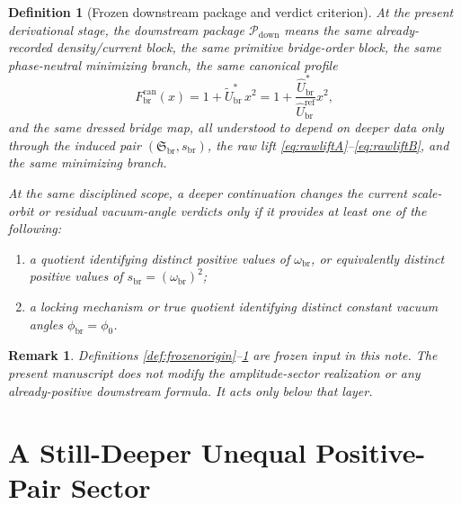\documentclass[11pt]{article}
\newcommand{\RespShapeEq}{\widetilde U_{\mathrm{br}}^{\ast}}
\newcommand{\RespRawRef}{\widehat U_{\mathrm{br}}^{\mathrm{ref}}}
\newcommand{\RespRawEq}{\widehat U_{\mathrm{br}}^{\ast}}
\newcommand{\RespVacPhase}{\phi_{\mathrm{br}}}
\newcommand{\CurvProfileCan}{F_{\mathrm{br}}^{\mathrm{can}}}
\newcommand{\DownPkg}{\mathscr P_{\mathrm{down}}}
\newcommand{\ShapeTuple}{\mathfrak S_{\mathrm{br}}}
\newcommand{\ScaleMod}{s_{\mathrm{br}}}
\newcommand{\AbsScaleAmp}{\omega_{\mathrm{br}}}
\newtheorem{definition}{Definition}
\newtheorem{remark}{Remark}
\begin{document}
\begin{definition}[Frozen downstream package and verdict criterion]
\label{def:frozendown}
At the present derivational stage, the downstream package \(\DownPkg\) means the same already-recorded density/current block, the same primitive bridge-order block, the same phase-neutral minimizing branch, the same canonical profile
\begin{equation}
\CurvProfileCan(x)
=
1+\RespShapeEq\,x^{2}
=
1+\frac{\RespRawEq}{\RespRawRef}x^{2},
\label{eq:profile}
\end{equation}
and the same dressed bridge map, all understood to depend on deeper data only through the induced pair \((\ShapeTuple,\ScaleMod)\), the raw lift \eqref{eq:rawliftA}--\eqref{eq:rawliftB}, and the same minimizing branch.

At the same disciplined scope, a deeper continuation changes the current scale-orbit or residual vacuum-angle verdicts only if it provides at least one of the following:
\begin{enumerate}
    \item a quotient identifying distinct positive values of \(\AbsScaleAmp\), or equivalently distinct positive values of \(\ScaleMod=(\AbsScaleAmp)^{2}\);
    \item a locking mechanism or true quotient identifying distinct constant vacuum angles \(\RespVacPhase=\phi_{0}\).
\end{enumerate}
\end{definition}

\begin{remark}
Definitions \ref{def:frozenorigin}--\ref{def:frozendown} are frozen input in this note. The present manuscript does not modify the amplitude-sector realization or any already-positive downstream formula. It acts only below that layer.
\end{remark}

\section{A Still-Deeper Unequal Positive-Pair Sector}
\end{document}
